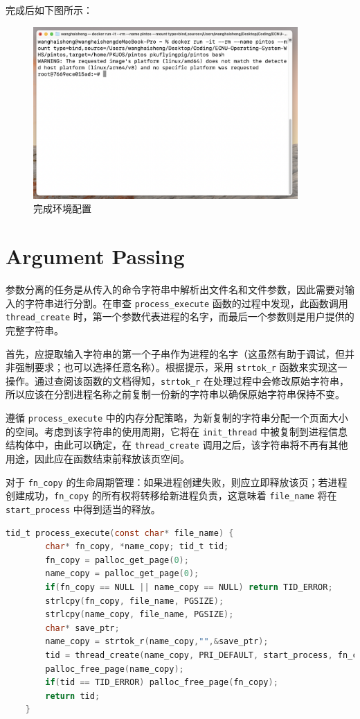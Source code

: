 \documentclass{article}
\begin{document}
完成后如下图所示：

\begin{figure}[H]
	\centering
	\includegraphics[width=0.9\textwidth]{img/run_docker.png}
	\caption{完成环境配置}
\end{figure}

\section{Argument Passing}

参数分离的任务是从传入的命令字符串中解析出文件名和文件参数，因此需要对输入的字符串进行分割。在审查 \texttt{process\_execute} 函数的过程中发现，此函数调用 \texttt{thread\_create} 时，第一个参数代表进程的名字，而最后一个参数则是用户提供的完整字符串。

首先，应提取输入字符串的第一个子串作为进程的名字（这虽然有助于调试，但并非强制要求；也可以选择任意名称）。根据提示，采用 \texttt{strtok\_r} 函数来实现这一操作。通过查阅该函数的文档得知，\texttt{strtok\_r} 在处理过程中会修改原始字符串，所以应该在分割进程名称之前复制一份新的字符串以确保原始字符串保持不变。

遵循 \texttt{process\_execute} 中的内存分配策略，为新复制的字符串分配一个页面大小的空间。考虑到该字符串的使用周期，它将在 \texttt{init\_thread} 中被复制到进程信息结构体中，由此可以确定，在 \texttt{thread\_create} 调用之后，该字符串将不再有其他用途，因此应在函数结束前释放该页空间。

对于 \texttt{fn\_copy} 的生命周期管理：如果进程创建失败，则应立即释放该页；若进程创建成功，\texttt{fn\_copy} 的所有权将转移给新进程负责，这意味着 \texttt{file\_name} 将在 \texttt{start\_process} 中得到适当的释放。

\begin{lstlisting}[language=C]
	tid_t process_execute(const char* file_name) { 
		char* fn_copy, *name_copy; tid_t tid;
		fn_copy = palloc_get_page(0); 
		name_copy = palloc_get_page(0); 
		if(fn_copy == NULL || name_copy == NULL) return TID_ERROR;
		strlcpy(fn_copy, file_name, PGSIZE); 
		strlcpy(name_copy, file_name, PGSIZE);
		char* save_ptr; 
		name_copy = strtok_r(name_copy,"",&save_ptr);
		tid = thread_create(name_copy, PRI_DEFAULT, start_process, fn_copy);
		palloc_free_page(name_copy);
		if(tid == TID_ERROR) palloc_free_page(fn_copy);
		return tid; 
	}
\end{lstlisting}
\end{document}
